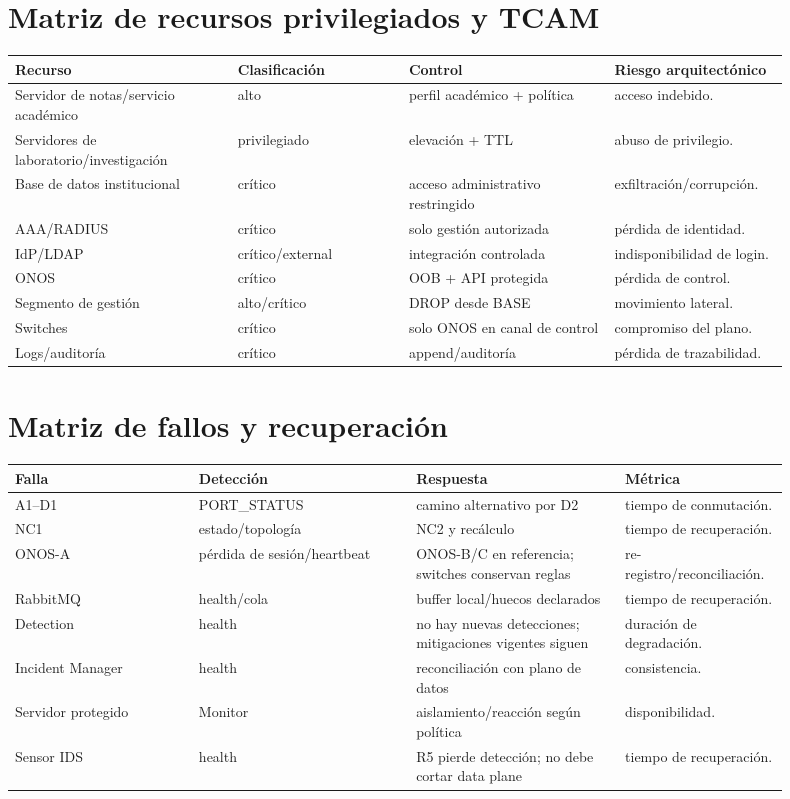 \documentclass[11pt,a4paper]{article}
\begin{document}
\section{Matriz de recursos privilegiados y TCAM}

\begin{longtable}{p{0.26\linewidth}p{0.2\linewidth}p{0.24\linewidth}p{0.2\linewidth}}
\toprule
Recurso & Clasificación & Control & Riesgo arquitectónico\\
\midrule
Servidor de notas/servicio académico & alto & perfil académico + política & acceso indebido.\\
Servidores de laboratorio/investigación & privilegiado & elevación + TTL & abuso de privilegio.\\
Base de datos institucional & crítico & acceso administrativo restringido & exfiltración/corrupción.\\
AAA/RADIUS & crítico & solo gestión autorizada & pérdida de identidad.\\
IdP/LDAP & crítico/external & integración controlada & indisponibilidad de login.\\
ONOS & crítico & OOB + API protegida & pérdida de control.\\
Segmento de gestión & alto/crítico & DROP desde BASE & movimiento lateral.\\
Switches & crítico & solo ONOS en canal de control & compromiso del plano.\\
Logs/auditoría & crítico & append/auditoría & pérdida de trazabilidad.\\
\bottomrule
\end{longtable}

\section{Matriz de fallos y recuperación}

\begin{longtable}{p{0.22\linewidth}p{0.26\linewidth}p{0.25\linewidth}p{0.17\linewidth}}
\toprule
Falla & Detección & Respuesta & Métrica\\
\midrule
A1--D1 & PORT\_STATUS & camino alternativo por D2 & tiempo de conmutación.\\
NC1 & estado/topología & NC2 y recálculo & tiempo de recuperación.\\
ONOS-A & pérdida de sesión/heartbeat & ONOS-B/C en referencia; switches conservan reglas & re-registro/reconciliación.\\
RabbitMQ & health/cola & buffer local/huecos declarados & tiempo de recuperación.\\
Detection & health & no hay nuevas detecciones; mitigaciones vigentes siguen & duración de degradación.\\
Incident Manager & health & reconciliación con plano de datos & consistencia.\\
Servidor protegido & Monitor & aislamiento/reacción según política & disponibilidad.\\
Sensor IDS & health & R5 pierde detección; no debe cortar data plane & tiempo de recuperación.\\
\bottomrule
\end{longtable}
\end{document}
